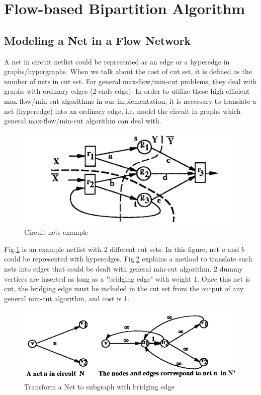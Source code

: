 \documentclass[conference,10pt]{IEEEtran}
\begin{document}
\section{Flow-based Bipartition Algorithm}
\label{sec:intro}

\subsection{Modeling a Net in a Flow Network}
A net in circuit netlist could be represented as an edge or a hyperedge in graphs/hypergraphs.
When we talk about the cost of cut set, it is defined as the number of nets in cut set. For
general max-flow/min-cut problems, they deal with graphs with ordinary edges (2-ends edge).
In order to utilize these high efficient max-flow/min-cut algorithms in our implementation,
it is necessary to translate a net (hyperedge) into an ordinary edge, i.e. model the circuit in
graphs which general max-flow/min-cut algorithm can deal with.
\begin{figure}[hbt]
	\begin{center}
	\includegraphics[scale=0.5]{figckt.png}
	\end{center}
	\caption{Circuit nets example}
	\label{fig:ckt}
\end{figure}

Fig.\ref{fig:ckt} is an example netlist with 2 different cut sets. In this figure, net $a$ and $b$
could be represented with hyperedges. Fig.\ref{fig:net} explains a method to translate such nets into
edges that could be dealt with general min-cut algorithm. 2 dummy vertices are inserted as long as a "bridging edge"
with weight 1. Once this net is cut, the bridging edge must be included in the cut set from the output
of any general min-cut algorithm, and cost is 1.

\begin{figure}[hbt]
	\begin{center}
	\includegraphics[scale=0.5]{fignet.png}
	\end{center}
	\caption{Transform a Net to subgraph with bridging edge}
	\label{fig:net}
\end{figure}
\end{document}
